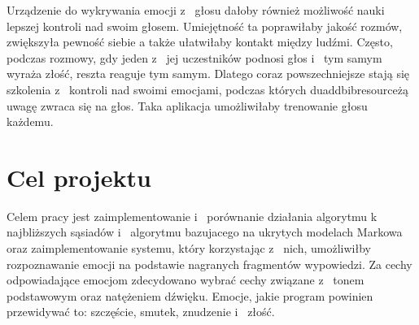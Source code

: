 \documentclass[declaration,shortabstract]{iithesis}
\begin{document}
Urządzenie do wykrywania emocji z~ głosu dałoby również możliwość nauki lepszej kontroli nad swoim głosem. Umiejętność ta poprawiłaby jakość rozmów, zwiększyła pewność siebie a także ułatwiłaby kontakt między ludźmi. Często, podczas rozmowy, gdy jeden z~ jej uczestników podnosi głos i~ tym samym wyraża złość, reszta reaguje tym samym. Dlatego coraz powszechniejsze stają się szkolenia z~ kontroli nad swoimi emocjami, podczas których duaddbibresourceżą uwagę zwraca się na głos. Taka aplikacja umożliwiłaby trenowanie głosu każdemu. 

\section{Cel projektu}
Celem pracy jest zaimplementowanie i~ porównanie działania algorytmu k~ najbliższych sąsiadów i~ algorytmu bazujacego na ukrytych modelach Markowa oraz zaimplementowanie systemu, który korzystając z~ nich, umożliwiłby rozpoznawanie emocji na podstawie nagranych fragmentów wypowiedzi.
Za cechy odpowiadające emocjom zdecydowano wybrać cechy związane z~ tonem podstawowym oraz natężeniem dźwięku. Emocje, jakie program powinien przewidywać to: szczęście, smutek, znudzenie i~ złość.
\end{document}
